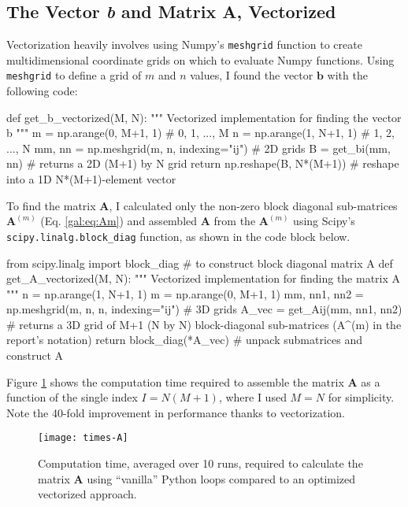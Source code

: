 \documentclass[11pt, a4paper]{article}
\newcommand{\mat}[1]{\mathbf{#1}}
\renewcommand{\vec}[1]{\bm{#1}}
\begin{document}
\subsection{The Vector \textit{b} and Matrix A, Vectorized} \label{gal:ss:Ab-vec}
Vectorization heavily involves using Numpy's \texttt{meshgrid} function to create multidimensional coordinate grids on which to evaluate Numpy functions. Using \texttt{meshgrid} to define a grid of $ m $ and $ n $ values, I found the vector $ \vec{b} $ with the following code:
\begin{python}
def get_b_vectorized(M, N):
    """ Vectorized implementation for finding the vector b """
    m = np.arange(0, M+1, 1)  # 0, 1, ..., M
    n = np.arange(1, N+1, 1)  # 1, 2, ..., N
    mm, nn = np.meshgrid(m, n, indexing="ij")  # 2D grids
    B = get_bi(mm, nn)             # returns a 2D (M+1) by N grid
    return np.reshape(B, N*(M+1))  # reshape into a 1D N*(M+1)-element vector
\end{python}
To find the matrix $ \mat{A} $, I calculated only the non-zero block diagonal sub-matrices $ \mat{A}^{(m)} $ (Eq. \ref{gal:eq:Am}) and assembled $ \mat{A} $ from the $ \mat{A}^{(m)} $ using Scipy's \texttt{scipy.linalg.block\_diag} function, as shown in the code block below.
\begin{python}
from scipy.linalg import block_diag  # to construct block diagonal matrix A
def get_A_vectorized(M, N):
    """ Vectorized implementation for finding the matrix A """
    n = np.arange(1, N+1, 1)
    m = np.arange(0, M+1, 1)
    mm, nn1, nn2 = np.meshgrid(m, n, n, indexing="ij")  # 3D grids
    A_vec = get_Aij(mm, nn1, nn2)  # returns a 3D grid of M+1 (N by N) block-diagonal sub-matrices (A^{(m)} in the report's notation)
    return block_diag(*A_vec)      # unpack submatrices and construct A
\end{python}
Figure \ref{gal:fig:times-A} shows the computation time required to assemble the matrix $ \mat{A} $ as a function of the single index $ I = N(M+1) $, where I used $ M = N $ for simplicity. Note the 40-fold improvement in performance thanks to vectorization.

\begin{figure}[htb!]
\centering
\texttt{[image: times-A]}
\caption{Computation time, averaged over 10 runs, required to calculate the matrix $ \mat{A} $ using ``vanilla'' Python loops compared to an optimized vectorized approach.}
\label{gal:fig:times-A}
\end{figure}
\end{document}
